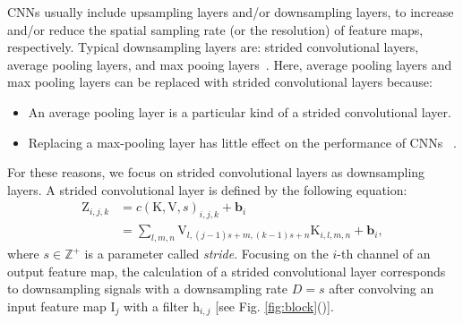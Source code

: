 \documentclass{article}
\newcommand{\myvector}[1]{\boldsymbol{#1}}
\newcommand{\mymatrix}[1]{\mathrm{#1}}
\newcommand{\mytensor}[1]{\boldsymbol{\mathrm{#1}}}
\newcommand{\myset}[1]{\mathbb{#1}}
\newcounter{num}
\begin{document}
  CNNs usually include upsampling layers and/or downsampling layers,
  to increase and/or reduce
  the spatial sampling rate (or the resolution) of feature maps, respectively.
  Typical downsampling layers are: strided convolutional layers,
  average pooling layers, and max pooing layers~\cite{goodfellow2016deep}.
  Here, average pooling layers and max pooling layers can be replaced
  with strided convolutional layers
  because:
  \begin{itemize}[nosep]
    \item An average pooling layer is a particular kind of a strided convolutional layer.
    \item Replacing a max-pooling layer has little effect on the performance of CNNs
  ~\cite{springenberg2014striving}.
  \end{itemize}
  For these reasons, we focus on strided convolutional layers
  as downsampling layers.
  A strided convolutional layer is defined by the following equation:
  \begin{align}
    \mytensor{Z}_{i, j, k} &= c(\mytensor{K}, \mytensor{V}, s)_{i, j, k}
                            + \myvector{b}_i \nonumber \\
                           &= \sum_{l, m, n} \mytensor{V}_{l, (j-1)s+m, (k-1)s+n}
                                             \mytensor{K}_{i, l, m, n}
                            + \myvector{b}_i,
    \label{eq:strided_conv_layer}
  \end{align}
  where $s \in \myset{Z^+}$ is a parameter called \textit{stride}.
  Focusing on the $i$-th channel of an output feature map,
  the calculation of a strided convolutional layer corresponds to
  downsampling signals with a downsampling rate $D=s$ after
  convolving an input feature map $\mymatrix{I}_j$ with a filter $\mymatrix{h}_{i, j}$
  [see Fig. \ref{fig:block}()].
\end{document}
